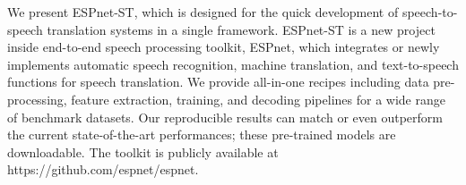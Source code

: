 We present ESPnet-ST, which is designed for the quick development of speech-to-speech translation systems in a single framework. ESPnet-ST is a new project inside end-to-end speech processing toolkit, ESPnet, which integrates or newly implements automatic speech recognition, machine translation, and text-to-speech functions for speech translation. We provide all-in-one recipes including data pre-processing, feature extraction, training, and decoding pipelines for a wide range of benchmark datasets. Our reproducible results can match or even outperform the current state-of-the-art performances; these pre-trained models are downloadable. The toolkit is publicly available at https://github.com/espnet/espnet.
